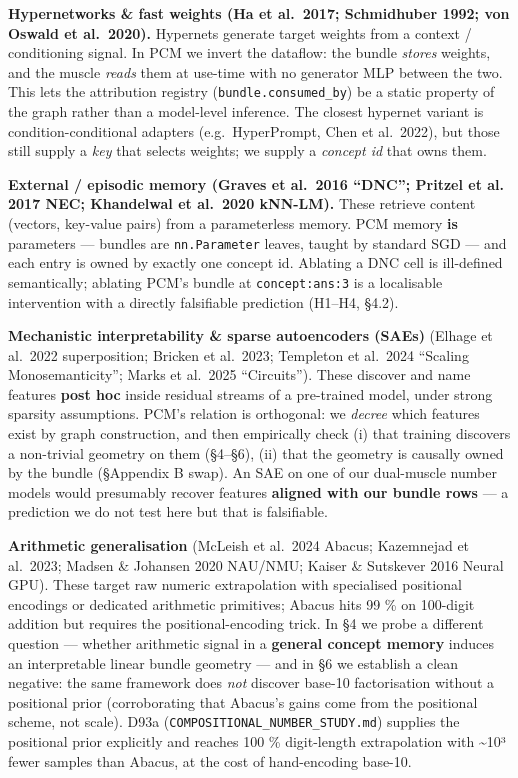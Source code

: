 \textbf{Hypernetworks \& fast weights (Ha et al.~2017; Schmidhuber 1992;
von Oswald et al.~2020).} Hypernets generate target weights from a
context / conditioning signal. In PCM we invert the dataflow: the
bundle \emph{stores} weights, and the muscle \emph{reads} them at use-time
with no generator MLP between the two. This lets the attribution
registry (\texttt{bundle.consumed\_by}) be a static property of the graph
rather than a model-level inference. The closest hypernet variant is
condition-conditional adapters (e.g.~HyperPrompt, Chen et al.~2022),
but those still supply a \emph{key} that selects weights; we supply a
\emph{concept id} that owns them.

\textbf{External / episodic memory (Graves et al.~2016 ``DNC''; Pritzel et al.
2017 NEC; Khandelwal et al.~2020 kNN-LM).} These retrieve content
(vectors, key-value pairs) from a parameterless memory. PCM memory
\textbf{is} parameters --- bundles are \texttt{nn.Parameter} leaves, taught by
standard SGD --- and each entry is owned by exactly one concept id.
Ablating a DNC cell is ill-defined semantically; ablating PCM's
bundle at \texttt{concept:ans:3} is a localisable intervention with a
directly falsifiable prediction (H1--H4, §4.2).

\textbf{Mechanistic interpretability \& sparse autoencoders (SAEs)} (Elhage
et al.~2022 superposition; Bricken et al.~2023; Templeton et al.~2024
``Scaling Monosemanticity''; Marks et al.~2025 ``Circuits''). These
discover and name features \textbf{post hoc} inside residual streams of a
pre-trained model, under strong sparsity assumptions. PCM's relation
is orthogonal: we \emph{decree} which features exist by graph
construction, and then empirically check (i) that training discovers
a non-trivial geometry on them (§4--§6), (ii) that the geometry is
causally owned by the bundle (§Appendix B swap). An SAE on one of our
dual-muscle number models would presumably recover features
\textbf{aligned with our bundle rows} --- a prediction we do not test here
but that is falsifiable.

\textbf{Arithmetic generalisation} (McLeish et al.~2024 Abacus;
Kazemnejad et al.~2023; Madsen \& Johansen 2020 NAU/NMU; Kaiser \&
Sutskever 2016 Neural GPU). These target raw numeric extrapolation
with specialised positional encodings or dedicated arithmetic
primitives; Abacus hits 99 \% on 100-digit addition but requires the
positional-encoding trick. In §4 we probe a different question ---
whether arithmetic signal in a \textbf{general concept memory} induces an
interpretable linear bundle geometry --- and in §6 we establish a
clean negative: the same framework does \emph{not} discover base-10
factorisation without a positional prior (corroborating that Abacus's
gains come from the positional scheme, not scale). D93a
(\texttt{COMPOSITIONAL\_NUMBER\_STUDY.md}) supplies the positional prior
explicitly and reaches 100 \% digit-length extrapolation with \textasciitilde10³
fewer samples than Abacus, at the cost of hand-encoding base-10.

